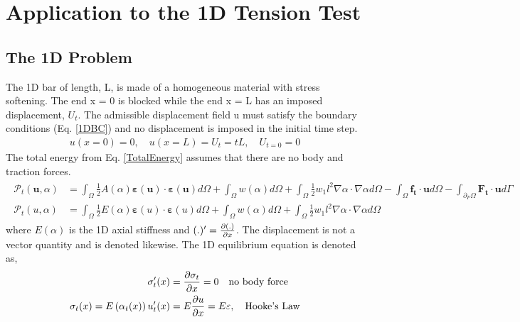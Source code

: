 \documentclass[12pt,3p]{article}
\numberwithin{equation}{section}
\begin{document}
\section{Application to the 1D Tension Test}

\subsection{The 1D Problem}
The 1D bar of length, L, is made of a homogeneous material with stress softening. The end x = 0 is blocked while the end x = L has an imposed displacement, $U_t$. The admissible displacement field u must satisfy the boundary conditions (Eq. \ref{1DBC}) and no displacement is imposed in the initial time step. 
\begin{align}\label{1DBC}
u(x = 0) = 0, \quad u(x = L) = U_t = t L, \quad U_{t = 0} = 0
\end{align}
The total energy from Eq. \ref{TotalEnergy} assumes that there are no body and traction forces. 
\begin{align}\label{1DtotEnergy}
\begin{split}
\mathcal{P}_t (\mathbf{u}, \alpha) 
&= \int_{\Omega} \frac{1}{2} A (\alpha) \boldsymbol{\varepsilon} (\mathbf{u}) \cdot \boldsymbol{\varepsilon} (\mathbf{u}) d \Omega + \int_{\Omega} w (\alpha) d \Omega + \int_{\Omega} \frac{1}{2} w_1 l^2 \nabla \alpha \cdot \nabla \alpha d \Omega - \int_{\Omega} \mathbf{f_t} \cdot \mathbf{u} d \Omega - \int_{\partial_F \Omega} \mathbf{F_t} \cdot \mathbf{u} d \Gamma \\
\mathcal{P}_t (u, \alpha) 
&= \int_{\Omega} \frac{1}{2} E (\alpha) \boldsymbol{\varepsilon} (u) \cdot \boldsymbol{\varepsilon} (u) d \Omega + \int_{\Omega} w (\alpha) d \Omega + \int_{\Omega} \frac{1}{2} w_1 l^2 \nabla \alpha \cdot \nabla \alpha d \Omega
\end{split}
\end{align}
where $E(\alpha)$ is the 1D axial stiffness and $(.)' = \pdv{(.)}{x}$. The displacement is not a vector quantity and is denoted likewise. The 1D equilibrium equation is denoted as,
\begin{align}\label{1DEqm}
\begin{split}
\sigma_{t}^{\prime}(x) &= \pdv{\sigma_t}{x} = 0 \quad \text{no body force} \\
\sigma_{t}(x) = E\left(\alpha_{t}(x)\right) u_{t}^{\prime}(x) &= E \pdv{u}{x} = E \varepsilon, \quad \text{Hooke's Law}
\end{split}
\end{align}
\end{document}
